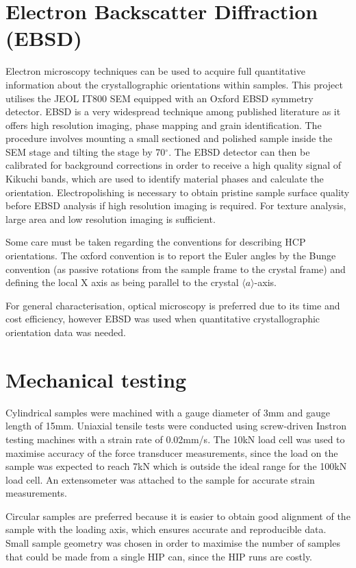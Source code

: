 \section{Electron Backscatter Diffraction (EBSD)}
Electron microscopy techniques can be used to acquire full quantitative information about the crystallographic orientations within samples.
This project utilises the JEOL IT800 SEM equipped with an Oxford EBSD symmetry detector.
EBSD is a very widespread technique among published literature as it offers high resolution imaging, phase mapping and grain identification.
The procedure involves mounting a small sectioned and polished sample inside the SEM stage and tilting the stage by 70$^\circ$.
The EBSD detector can then be calibrated for background corrections in order to receive a high quality signal of Kikuchi bands, which are used to identify material phases and calculate the orientation.
Electropolishing is necessary to obtain pristine sample surface quality before EBSD analysis if high resolution imaging is required.
For texture analysis, large area and low resolution imaging is sufficient.

Some care must be taken regarding the conventions for describing HCP orientations.
The oxford convention is to report the Euler angles by the Bunge convention (as passive rotations from the sample frame to the crystal frame) and defining the local X axis as being parallel to the crystal $\langle a \rangle$-axis.

For general characterisation, optical microscopy is preferred due to its time and cost efficiency, however EBSD was used when quantitative crystallographic orientation data was needed.

\section{Mechanical testing}
Cylindrical samples were machined with a gauge diameter of 3mm and gauge length of 15mm.
Uniaxial tensile tests were conducted using screw-driven Instron testing machines with a  strain rate of 0.02mm/s.
The 10kN load cell was used to maximise accuracy of the force transducer measurements, since the load on the sample was expected to reach 7kN which is outside the ideal range for the 100kN load cell.
An extensometer was attached to the sample for accurate strain measurements.

Circular samples are preferred because it is easier to obtain good alignment of the sample with the loading axis, which ensures accurate and reproducible data.
Small sample geometry was chosen in order to maximise the number of samples that could be made from a single HIP can, since the HIP runs are costly.

